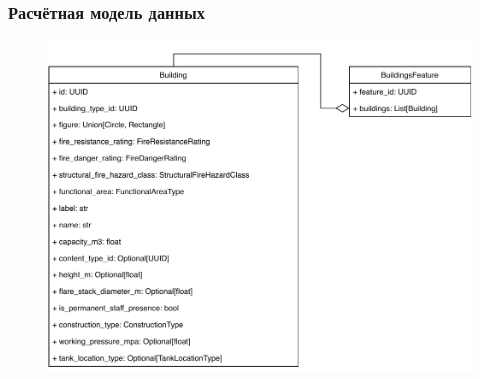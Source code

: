 \begin{frame}
\frametitle{Расчётная модель данных}
\begin{figure}
    \includegraphics[scale=.5]{pictures/implementation/model_feature}
\end{figure}
\end{frame}
